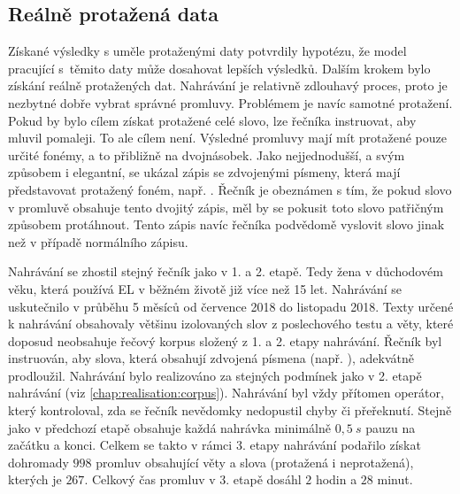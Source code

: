 
\subsection{Reálně protažená data}
\label{chap:realisation:augmentation:real}

Získané výsledky s uměle protaženými daty potvrdily hypotézu, že model pracující s~těmito daty může dosahovat lepších výsledků.
Dalším krokem bylo získání reálně protažených dat.
Nahrávání je relativně zdlouhavý proces,
proto je nezbytné dobře vybrat správné promluvy.
Problémem je navíc samotné protažení.
Pokud by bylo cílem získat protažené celé slovo, lze řečníka instruovat, aby mluvil pomaleji.
To ale cílem není.
Výsledné promluvy mají mít protažené pouze určité fonémy, a to přibližně na dvojnásobek.
Jako nejjednodušší, a svým způsobem i elegantní, se ukázal zápis se zdvojenými písmeny, která mají představovat protažený foném, např. .
Řečník je obeznámen s tím, že pokud slovo v promluvě obsahuje tento dvojitý zápis, měl by se pokusit toto slovo patřičným způsobem protáhnout.
Tento zápis navíc řečníka podvědomě  vyslovit slovo jinak než v případě normálního zápisu.

Nahrávání se zhostil stejný řečník jako v 1. a 2. etapě.
Tedy žena v důchodovém věku, která používá EL v běžném životě již více než 15 let.
Nahrávání se uskutečnilo v průběhu 5 měsíců od července 2018 do listopadu 2018.
Texty určené k nahrávání obsahovaly většinu izolovaných slov z poslechového testu a věty, které doposud neobsahuje řečový korpus složený z 1. a 2. etapy nahrávání.
Řečník byl instruován, aby slova, která obsahují zdvojená písmena (např. ), adekvátně prodloužil.
Nahrávání bylo realizováno za stejných podmínek jako v 2. etapě nahrávání (viz \ref{chap:realisation:corpus}).
Nahrávání byl vždy přítomen operátor, který kontroloval, zda se řečník nevědomky nedopustil chyby či přeřeknutí.
Stejně jako v předchozí etapě obsahuje každá nahrávka minimálně $0,5\ s$ pauzu na začátku a konci.
Celkem se takto v rámci 3. etapy nahrávání podařilo získat dohromady $998$ promluv obsahující věty a slova (protažená i neprotažená), kterých je $267$.
Celkový čas promluv v 3. etapě dosáhl $2$ hodin a $28$ minut.

